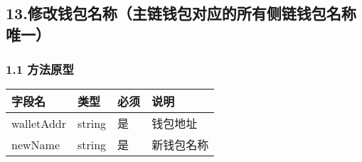 \documentclass[letterpaper,10pt,english]{sphinxmanual}
\begin{document}
\begin{sphinxVerbatim}[commandchars=\\\{\}]
     
     
\end{sphinxVerbatim}


\begin{sphinxVerbatim}[commandchars=\\\{\}]
     
\end{sphinxVerbatim}


\subsection{13.修改钱包名称（主链钱包对应的所有侧链钱包名称唯一）}
\label{\detokenize{BCBWalletSDK_u63a5_u53e3_u8bf4_u660e:id53}}

\subsubsection{1.1 方法原型}
\label{\detokenize{BCBWalletSDK_u63a5_u53e3_u8bf4_u660e:id54}}



\begin{savenotes}\sphinxattablestart
\centering
\begin{tabulary}{\linewidth}[t]{|T|T|T|T|}
\hline
\sphinxstyletheadfamily 
字段名
&\sphinxstyletheadfamily 
类型
&\sphinxstyletheadfamily 
必须
&\sphinxstyletheadfamily 
说明
\\
\hline
walletAddr
&
string
&
是
&
钱包地址
\\
\hline
newName
&
string
&
是
&
新钱包名称
\\
\hline
\end{tabulary}
\par
\sphinxattableend\end{savenotes}
\end{document}

